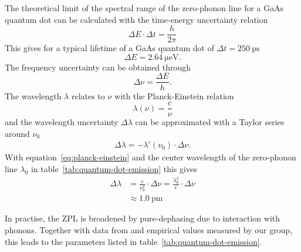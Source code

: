 \newpage

The theoretical limit of the spectral range of the zero-phonon line for a GaAs quantum dot can be calculated with the time-energy uncertainty relation
\begin{equation}
\Delta E \cdot \Delta t = \frac{h}{2 \pi}
\end{equation}
This gives for a typical lifetime of a GaAs quantum dot of $\Delta t = \SI{250}{\pico \second}$
\begin{equation}
\Delta E = \SI{2.64}{\micro \electronvolt}.
\end{equation}
The frequency uncertainty can be obtained through
\begin{equation}
\label{eq:planck-einstein}
\Delta \nu = \frac{\Delta E}{h}.
\end{equation}
The wavelength $\lambda$ relates to $\nu$ with the Planck-Einstein relation
\begin{equation}
\lambda(\nu) = \frac{c}{\nu}
\end{equation}
and the wavelength uncertainty $\Delta \lambda$ can be approximated with a Taylor series around $\nu_0$
\begin{align}
\Delta \lambda = - \lambda'(\nu_0)\cdot \Delta \nu.
\end{align}
With equation~\eqref{eq:planck-einstein} and the center wavelength of the zero-phonon line $\lambda_{0}$ in table~\ref{tab:quantum-dot-emission} this gives
\begin{align}
\Delta \lambda &= \frac{c}{\nu_0^2} \cdot \Delta \nu = \frac{\lambda_0^2}{c}\cdot\Delta \nu\\
\label{eq:zero-phonon-theoretical-limit}
&\approx \SI{1.0}{\pico \metre}
\end{align}

In practise, the \ac{ZPL} is broadened by pure-dephasing due to interaction with phonons. 
Together with data from \textcite{scholl_resonance_2019} and empirical values measured by our group, this leads to the parameters listed in table~\ref{tab:quantum-dot-emission}.

